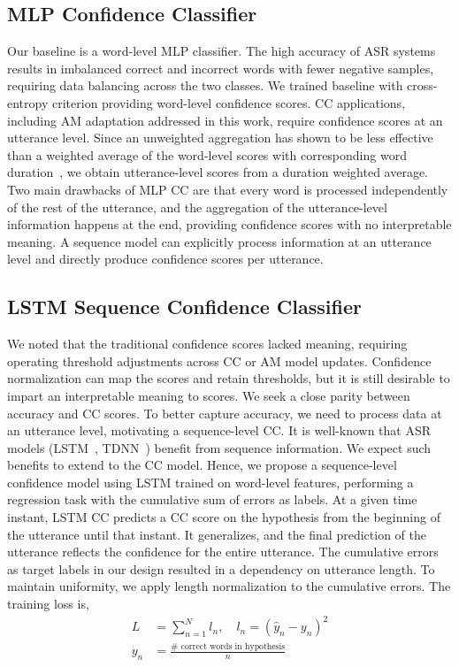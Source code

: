 \documentclass[a4paper]{article}
\begin{document}
\subsection{MLP Confidence Classifier}
\label{sec:MLP}
Our baseline is a word-level MLP classifier. The high accuracy of ASR systems results in imbalanced correct and incorrect words with fewer negative samples, requiring data balancing across the two classes. We trained baseline with cross-entropy criterion providing word-level confidence scores. CC applications, including AM adaptation addressed in this work, require confidence scores at an utterance level. Since an unweighted aggregation has shown to be less effective than a weighted average of the word-level scores with corresponding word duration~\cite{CMsurvey_Jiang_SpeechCommunication06}, we obtain utterance-level scores from a duration weighted average. Two main drawbacks of MLP CC are that every word is processed independently of the rest of the utterance, and the aggregation of the utterance-level information happens at the end, providing confidence scores with no interpretable meaning. A sequence model can explicitly process information at an utterance level and directly produce confidence scores per utterance. 
\subsection{LSTM Sequence Confidence Classifier \label{sec:lstm}} 
We noted that the traditional confidence scores lacked meaning, requiring operating threshold adjustments across CC or AM model updates. Confidence normalization can map the scores and retain thresholds, but it is still desirable to impart an interpretable meaning to scores. We seek a close parity between accuracy and CC scores. To better capture accuracy, we need to process data at an utterance level, motivating a sequence-level CC. It is well-known that ASR models (LSTM~\cite{Sak2014}, TDNN~\cite{Povey2016}) benefit from sequence information. We expect such benefits to extend to the CC model. Hence, we propose a sequence-level confidence model using LSTM trained on word-level features, performing a regression task with the cumulative sum of errors as labels. At a given time instant, LSTM CC predicts a CC score on the hypothesis from the beginning of the utterance until that instant. It generalizes, and the final prediction of the utterance reflects the confidence for the entire utterance. The cumulative errors as target labels in our design resulted in a dependency on utterance length. To maintain uniformity, we apply length normalization to the cumulative errors. The training loss is,
\vspace{-2em}
\begin{align}
    L &= \sum_{n=1}^N l_n, \hspace{1em} l_n = (\hat{y}_n - y_n)^2 \\
    y_n &= \frac{\# \textrm{ correct words in hypothesis}}{n}
\end{align}
\end{document}
